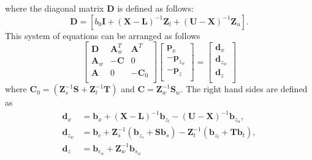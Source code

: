 \documentclass[12pt]{article}
\newcommand{\mb}{\mathbf}
\begin{document}
where the diagonal matrix $\mb{D}$ is defined as follows:
\begin{equation*}
  \mb{D} = \left[ b_{0} \mb{I} + (\mb{X} - \mb{L})^{-1}\mb{Z}_{l} + (\mb{U} - \mb{X})^{-1}\mb{Z}_{u} \right].
\end{equation*}
%
This system of equations can be arranged as follows
\begin{equation}
\label{eqn:kkt-reduced}
\begin{bmatrix}
\mb{D} & \mb{A}_{w}^{T} & \mb{A}^{T} \\
\mb{A}_{w} & -\mb{C} & 0 \\
\mb{A} & 0 & - \mb{C}_{0} \\
\end{bmatrix}
\begin{bmatrix}
\mb{p}_{x} \\
- \mb{p}_{z_{w}} \\
- \mb{p}_{z} \\
\end{bmatrix} =
\begin{bmatrix}
\mb{d}_{x} \\
\mb{d}_{z_{w}} \\
\mb{d}_{z} \\
\end{bmatrix}
\end{equation}
%
where $\mb{C}_{0} = (\mb{Z}_{s}^{-1}\mb{S} + \mb{Z}_{t}^{-1}\mb{T})$ and $\mb{C} =  \mb{Z}_{w}^{-1}\mb{S}_{w}$.
The right hand sides are defined as
\begin{equation*}
\begin{aligned}
\mb{d}_{x} &= \mb{b}_{x} + (\mb{X} - \mb{L})^{-1}\mb{b}_{z_{l}} - (\mb{U} - \mb{X})^{-1}\mb{b}_{z_{u}}, \\
\mb{d}_{z_{w}} &=  \mb{b}_{c} + \mb{Z}_{s}^{-1}(\mb{b}_{z_{s}} + \mb{S}\mb{b}_{s}) - \mb{Z}_{t}^{-1}(\mb{b}_{z_{t}} + \mb{T}\mb{b}_{t}), \\
\mb{d}_{z} &=  \mb{b}_{c_{w}} + \mb{Z}_{w}^{-1}\mb{b}_{s_{w}} \\
\end{aligned}
\end{equation*}
\end{document}
